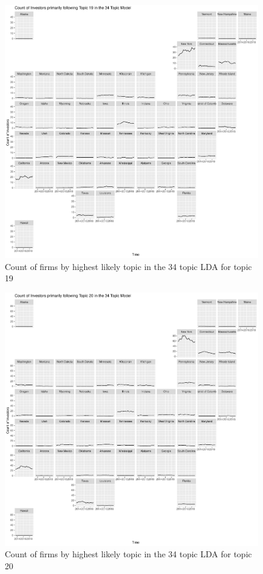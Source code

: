 		\begin{figure}
		\centering
		\includegraphics[width=1\linewidth]{Figures/ChapterV/USA_34_Topic19.pdf}
		\caption[Count of Firms for Topic 19 by Quarter]{Count of firms by highest likely topic in the 34 topic LDA for topic 19}
		\label{fig:StateLDA19}
	\end{figure}
	
		\begin{figure}
		\centering
		\includegraphics[width=1\linewidth]{Figures/ChapterV/USA_34_Topic20.pdf}
		\caption[Count of Firms for Topic 20 by Quarter]{Count of firms by highest likely topic in the 34 topic LDA for topic 20}
		\label{fig:StateLDA20}
	\end{figure}
	
